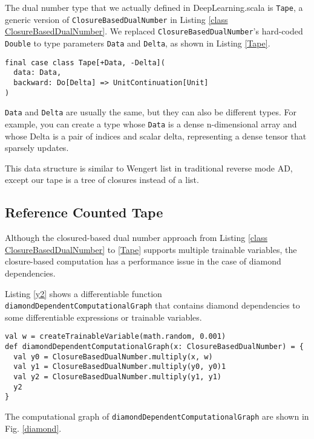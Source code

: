 The dual number type that we actually defined in DeepLearning.scala is \lstinline{Tape}, a generic version of \lstinline{ClosureBasedDualNumber} in Listing \ref{class ClosureBasedDualNumber}. We replaced \lstinline{ClosureBasedDualNumber}'s hard-coded \lstinline{Double} to type parameters \lstinline{Data} and \lstinline{Delta}, as shown in Listing \ref{Tape}.

\begin{lstlisting}[float={htbp},caption={Generic closured-based monadic dual number}, label={Tape}]
final case class Tape[+Data, -Delta](
  data: Data,
  backward: Do[Delta] => UnitContinuation[Unit]
)
\end{lstlisting}

\lstinline{Data} and \lstinline{Delta} are usually the same, but they can also be different types. For example, you can create a type whose \lstinline{Data} is a dense n-dimensional array and whose {Delta} is a pair of indices and scalar delta, representing a dense tensor that sparsely updates.

This data structure is similar to Wengert list in traditional reverse mode AD, except our tape is a tree of closures instead of a list.

\subsection{Reference Counted Tape}
\label{reference counted tape}

Although the closured-based dual number approach from Listing \ref{class ClosureBasedDualNumber} to \ref{Tape} supports multiple \glspl{trainable variable}, the closure-based computation has a performance issue in the case of diamond dependencies.

Listing \ref{y2} shows a \gls{differentiable function} \lstinline{diamondDependentComputationalGraph} that contains diamond dependencies to some \glspl{differentiable expression} or \glspl{trainable variable}.

\begin{lstlisting}[float={htbp},caption={A diamond dependent \gls{differentiable function}}, label={y2}]
val w = createTrainableVariable(math.random, 0.001)
def diamondDependentComputationalGraph(x: ClosureBasedDualNumber) = {
  val y0 = ClosureBasedDualNumber.multiply(x, w)
  val y1 = ClosureBasedDualNumber.multiply(y0, y0)1
  val y2 = ClosureBasedDualNumber.multiply(y1, y1)
  y2
}
\end{lstlisting}

The \gls{computational graph} of \lstinline{diamondDependentComputationalGraph} are shown in Fig. \ref{diamond}.

